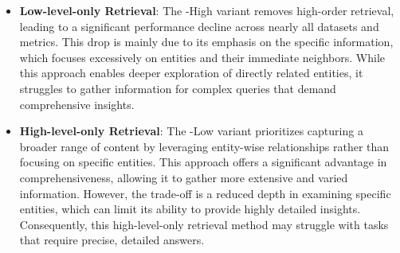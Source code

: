 \documentclass{article} %
\begin{document}
\begin{itemize}[leftmargin=*]
    \item \textbf{Low-level-only Retrieval}: The -High variant removes high-order retrieval, leading to a significant performance decline across nearly all datasets and metrics. This drop is mainly due to its emphasis on the specific information, which focuses excessively on entities and their immediate neighbors. While this approach enables deeper exploration of directly related entities, it struggles to gather information for complex queries that demand comprehensive insights.

    \item \textbf{High-level-only Retrieval}: The -Low variant prioritizes capturing a broader range of content by leveraging entity-wise relationships rather than focusing on specific entities. This approach offers a significant advantage in comprehensiveness, allowing it to gather more extensive and varied information. However, the trade-off is a reduced depth in examining specific entities, which can limit its ability to provide highly detailed insights. Consequently, this high-level-only retrieval method may struggle with tasks that require precise, detailed answers.


\end{itemize}
\end{document}
